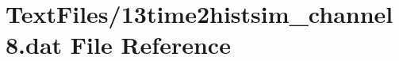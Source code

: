 \hypertarget{13time2histsim__channel8_8dat}{}\section{Text\+Files/13time2histsim\+\_\+channel8.dat File Reference}
\label{13time2histsim__channel8_8dat}
